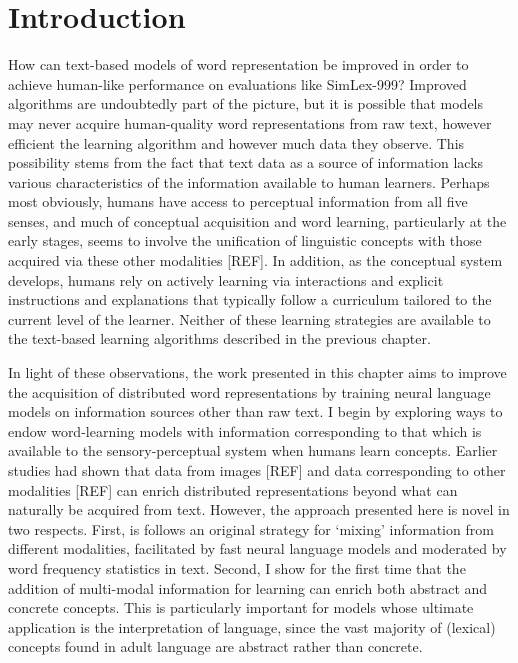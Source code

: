 
\section{Introduction}

How can text-based models of word representation be improved in order to achieve human-like performance on evaluations like SimLex-999? Improved algorithms are undoubtedly part of the picture, but it is possible that models may never acquire human-quality word representations from raw text, however efficient the learning algorithm and however much data they observe. This possibility stems from the fact that text data as a source of information lacks various characteristics of the information available to human learners. Perhaps most obviously, humans have access to perceptual information from all five senses, and much of conceptual acquisition and word learning, particularly at the early stages, seems to involve the unification of linguistic concepts with those acquired via these other modalities [REF]. In addition, as the conceptual system develops, humans rely on actively learning via interactions and explicit instructions and explanations that typically follow a curriculum tailored to the current level of the learner. Neither of these learning strategies are available to the text-based learning algorithms described in the previous chapter. 

In light of these observations, the work presented in this chapter aims to improve the acquisition of distributed word representations by training neural language models on information sources other than raw text. I begin by exploring ways to endow word-learning models with information corresponding to that which is available to the sensory-perceptual system when humans learn concepts. Earlier studies had shown that data from images [REF] and data corresponding to other modalities [REF] can enrich distributed representations beyond what can naturally be acquired from text. However, the approach presented here is novel in two respects. First, is follows an original strategy for `mixing' information from different modalities, facilitated by fast neural language models and moderated by word frequency statistics in text. Second, I show for the first time that the addition of multi-modal information for learning can enrich both abstract and concrete concepts. This is particularly important for models whose ultimate application is the interpretation of language, since the vast majority of (lexical) concepts found in adult language are abstract rather than concrete.  

